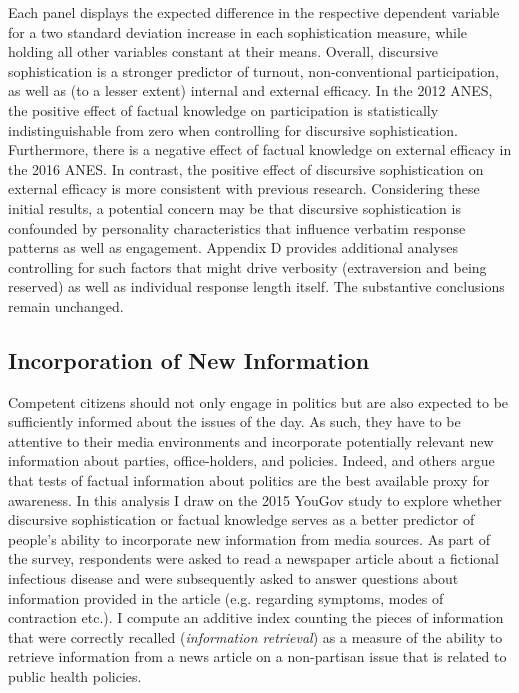 Each panel displays the expected difference in the respective dependent variable for a two standard deviation increase in each sophistication measure, while holding all other variables constant at their means. Overall, discursive sophistication is a stronger predictor of turnout, non-conventional participation, as well as (to a lesser extent) internal and external efficacy. In the 2012 ANES, the positive effect of factual knowledge on participation is statistically indistinguishable from zero when controlling for discursive sophistication. Furthermore, there is a negative effect of factual knowledge on external efficacy in the 2016 ANES. In contrast, the positive effect of discursive sophistication on external efficacy is more consistent with previous research. Considering these initial results, a potential concern may be that discursive sophistication is confounded by personality characteristics that influence verbatim response patterns as well as engagement. Appendix D provides additional analyses controlling for such factors that might drive verbosity (extraversion and being reserved) as well as individual response length itself. The substantive conclusions remain unchanged.


\subsection{Incorporation of New Information}
Competent citizens should not only engage in politics but are also expected to be sufficiently informed about the issues of the day. As such, they have to be attentive to their media environments and incorporate potentially relevant new information about parties, office-holders, and policies. Indeed, \citet{zaller1990political,zaller1992nature} and others argue that tests of factual information about politics are the best available proxy for awareness. In this analysis I draw on the 2015 YouGov study to explore whether discursive sophistication or factual knowledge serves as a better predictor of people's ability to incorporate new information from media sources. As part of the survey, respondents were asked to read a newspaper article about a fictional infectious disease and were subsequently asked to answer questions about information provided in the article (e.g. regarding symptoms, modes of contraction etc.). I compute an additive index counting the pieces of information that were correctly recalled (\textit{information retrieval}) as a measure of the ability to retrieve information from a news article on a non-partisan issue that is related to public health policies. 

